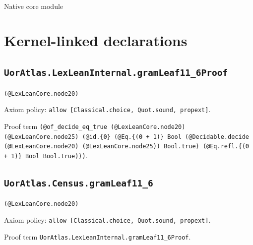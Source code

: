 \documentclass[11pt]{article}
\begin{document}
\begin{center}{\LARGE Native core module}\end{center}
\section*{Kernel-linked declarations}
\subsection*{\texttt{UorAtlas.LexLeanInternal.gramLeaf11\_6Proof}}
\noindent\texttt{(@LexLeanCore.node20)}\par
\noindent Axiom policy: \texttt{allow [Classical.choice, Quot.sound, propext]}.\par
\noindent Proof term \texttt{(@of\_decide\_eq\_true (@LexLeanCore.node20) (@LexLeanCore.node25) (@id.\{0\} (@Eq.\{(0 + 1)\} Bool (@Decidable.decide (@LexLeanCore.node20) (@LexLeanCore.node25)) Bool.true) (@Eq.refl.\{(0 + 1)\} Bool Bool.true)))}.\par
\subsection*{\texttt{UorAtlas.Census.gramLeaf11\_6}}
\noindent\texttt{(@LexLeanCore.node20)}\par
\noindent Axiom policy: \texttt{allow [Classical.choice, Quot.sound, propext]}.\par
\noindent Proof term \texttt{UorAtlas.LexLeanInternal.gramLeaf11\_6Proof}.\par
\end{document}
